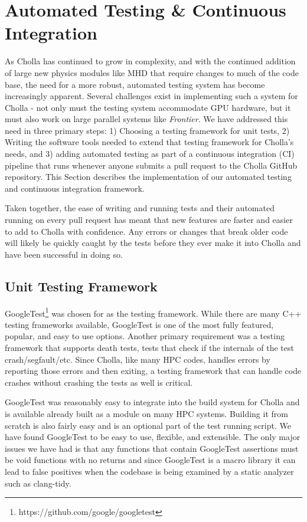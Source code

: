 \section{Automated Testing \& Continuous Integration}
\label{sec:testing}

As Cholla has continued to grow in complexity, and with the continued addition of large new physics modules like MHD that require changes to much of the code base, the need for a more robust, automated testing system has become increasingly apparent. Several challenges exist in implementing such a system for Cholla - not only must the testing system accommodate GPU hardware, but it must also work on large parallel systems like \textit{Frontier}. We have addressed this need in three primary steps: 1) Choosing a testing framework for unit tests, 2) Writing the software tools needed to extend that testing framework for Cholla's needs, and 3) adding automated testing as part of a continuous integration (CI) pipeline that runs whenever anyone submits a pull request to the Cholla GitHub repository. This Section describes the implementation of our automated testing and continuous integration framework.

Taken together, the ease of writing and running tests and their automated running on every pull request has meant that new features are faster and easier to add to Cholla with confidence. Any errors or changes that break older code will likely be quickly caught by the tests before they ever make it into Cholla and have been successful in doing so.

\subsection{Unit Testing Framework}
\label{sec:testing-framework}

GoogleTest\footnote{https://github.com/google/googletest} was chosen for as the testing framework. While there are many C++ testing frameworks available, GoogleTest is one of the most fully featured, popular, and easy to use options. Another primary requirement was a testing framework that supports death tests, tests that check if the internals of the test crash/segfault/etc. Since Cholla, like many HPC codes, handles errors by reporting those errors and then exiting, a testing framework that can handle code crashes without crashing the tests as well is critical.

GoogleTest was reasonably easy to integrate into the build system for Cholla and is available already built as a module on many HPC systems. Building it from scratch is also fairly easy and is an optional part of the test running script. We have found GoogleTest to be easy to use, flexible, and extensible. The only major issues we have had is that any functions that contain GoogleTest assertions must be void functions with no returns and since GoogleTest is a macro library it can lead to false positives when the codebase is being examined by a static analyzer such as clang-tidy.

